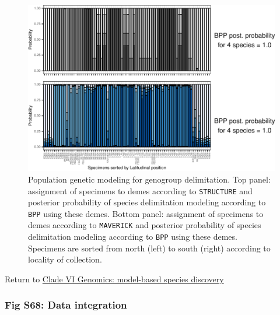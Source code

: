 \documentclass[
  11pt,
]{article}
\begin{document}
\begin{figure}
\includegraphics{Supplementary_Material_files/figure-latex/cladeVImolecularDelimitationPopGenBpp-1} \caption{Population genetic modeling for genogroup delimitation. Top panel: assignment of specimens to demes according to \texttt{STRUCTURE} and posterior probability of species delimitation modeling according to \texttt{BPP} using these demes. Bottom panel: assignment of specimens to demes according to \texttt{MAVERICK} and posterior probability of species delimitation modeling according to \texttt{BPP} using these demes. Specimens are sorted from north (left) to south (right) according to locality of collection.}\label{fig:cladeVImolecularDelimitationPopGenBpp}
\end{figure}

Return to \protect\hyperlink{model-based-species-discovery-11}{Clade VI Genomics: model-based species discovery}
\pagebreak

\hypertarget{fig-s68-data-integration}{%
\subsubsection{Fig S68: Data integration}\label{fig-s68-data-integration}}
\end{document}
